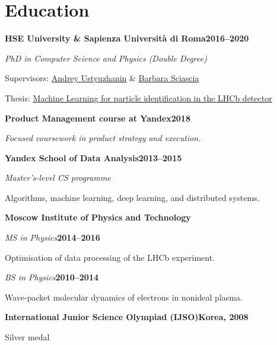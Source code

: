 \documentclass[11pt,a4paper]{article}
\newlength{\projindent}\setlength{\projindent}{1.3em}
\begin{document}
\section{Education}
\textbf{HSE University \& Sapienza Università di Roma}\hfill\textbf{2016--2020}\par
\textit{PhD in Computer Science and Physics (Double Degree)}\par
{\leftskip\projindent Supervisors: \href{https://www.linkedin.com/in/andreyustyuzhanin/}{Andrey Ustyuzhanin} \& \href{https://it.linkedin.com/in/barbara-sciascia-234935a}{Barbara Sciascia}\par}
{\leftskip\projindent Thesis: \href{https://repository.cern/records/034yx-nt191}{Machine Learning for particle identification in the LHCb detector}\par}
\smallskip

\textbf{Product Management course at Yandex}\hfill\textbf{2018}\par
\textit{Focused coursework in product strategy and execution.}\par
\smallskip

\textbf{Yandex School of Data Analysis}\hfill\textbf{2013--2015}\par
\textit{Master's-level CS programme}\par
{\leftskip\projindent Algorithms, machine learning, deep learning, and distributed systems.\par}
\smallskip

\textbf{Moscow Institute of Physics and Technology}\par
\textit{MS in Physics}\hfill\textbf{2014--2016}\par
{\leftskip\projindent Optimisation of data processing of the LHCb experiment.\par}
\textit{BS in Physics}\hfill\textbf{2010--2014}\par
{\leftskip\projindent Wave-packet molecular dynamics of electrons in nonideal plasma.\par}
\smallskip

\textbf{International Junior Science Olympiad (IJSO)}\hfill\textbf{Korea, 2008}\par
{\leftskip\projindent Silver medal\par}
\smallskip
\end{document}
